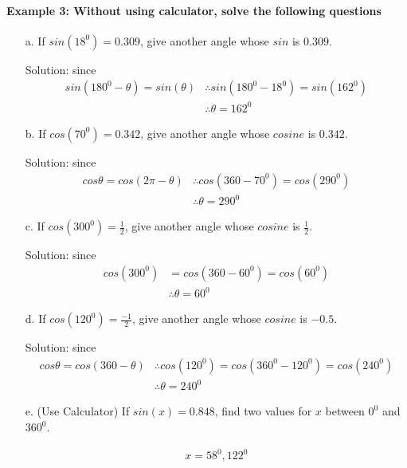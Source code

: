 \documentclass{article}
\begin{document}
\paragraph{Example 3: Without using calculator, solve the following questions}
\begin{enumerate}
  \item[a.] If $sin(18^{0})= 0.309$, give another angle whose $sin$ is $0.309$.
        
        {\small Solution: since}
        \[
        \begin{aligned}
          sin(180^0-\theta) = sin(\theta)
          &\therefore sin(180^{0}-18^{0}) = sin(162^{0}) \\
          &\therefore \theta = 162^{0}
        \end{aligned}
        \]

  \item[b.] If $cos(70^{0})= 0.342$, give another angle whose $cosine$ is $0.342$.

        {\small Solution: since}
        \[
        \begin{aligned}
          cos\theta = cos(2\pi - \theta)
          &\therefore cos(360-70^{0}) = cos(290^{0}) \\
          &\therefore \theta = 290^{0}
        \end{aligned}
        \]

  \item[c.] If $cos(300^{0})= \frac{1}{2}$, give another angle whose $cosine$ is $\frac{1}{2}$.

        {\small Solution: since}
        \[
        \begin{aligned}
          cos(300^{0}) &= cos(360-60^{0}) = cos(60^{0}) \\
                       &\therefore \theta = 60^{0}
        \end{aligned}
        \]

  \item[d.] If $cos(120^{0})= \frac{-1}{2}$, give another angle whose $cosine$ is $-0.5$.

        {\small Solution: since}
        \[
        \begin{aligned}
          cos\theta = cos(360-\theta)
          &\therefore cos(120^{0}) = cos(360^{0} - 120^{0}) = cos(240^{0}) \\
          &\therefore \theta = 240^{0}
        \end{aligned}
        \]

  \item[e.] (Use Calculator) If $sin(x)= 0.848$, find two values for $x$ between $0^{0}$ and $360^{0}$.

        \[
        \begin{aligned}
          x = 58^{0}, 122^{0}
        \end{aligned}
        \]
\end{enumerate}
\end{document}
